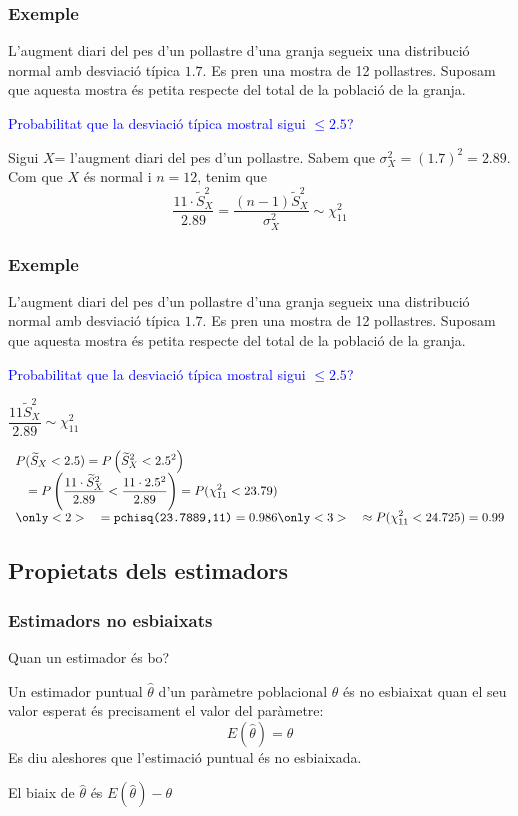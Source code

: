 \documentclass[12pt,t]{beamer}
\newcommand{\blue}[1]{\textcolor{blue}{#1}}
\renewcommand{\emph}[1]{{\color{red}#1}}
\renewcommand{\leq}{\leqslant}
\theoremstyle{plain}
\theoremstyle{definition}
\begin{document}
\begin{frame}
\frametitle{Exemple}
\vspace*{-2ex}

L'augment diari del pes d'un pollastre d'una granja segueix una
distribució normal amb desviació típica $1.7$. Es pren una
mostra de 12 pollastres. Suposam que aquesta mostra és petita respecte del total de la població de la granja.
\medskip

\blue{Probabilitat que la desviació típica mostral
sigui $\leq 2.5$?}
\medskip

Sigui $X$= l'augment diari del pes d'un pollastre. Sabem que $\sigma_{X}^2=(1.7)^2=2.89$. Com que $X$ és normal
 i $n=12$, tenim que
$$
\frac{11\cdot \widetilde{S}_{X}^2}{2.89}=\frac{(n-1)\widetilde{S}_{X}^2}{\sigma_{X}^2}\sim \chi^2_{11}
$$

        
\end{frame}


\begin{frame}
\frametitle{Exemple}
\vspace*{-2ex}

L'augment diari del pes d'un pollastre d'una granja segueix una
distribució normal amb desviació típica $1.7$. Es pren una
mostra de 12 pollastres. Suposam que aquesta mostra és petita respecte del total de la població de la granja.
\medskip

\blue{Probabilitat que la desviació típica mostral
sigui $\leq 2.5$?}
\medskip

$\dfrac{11\widetilde{S}_{X}^2}{2.89}\sim \chi^2_{11}$
\medskip

$\begin{array}{l}
\displaystyle P(\widetilde{S}_{X}<2.5)= P\left(\widetilde{S}_{X}^2<2.5^2\right)\\
\quad \displaystyle =P\left(\frac{11\cdot \widetilde{S}_{X}^2}{2.89}<\frac{11
\cdot 2.5^2}{2.89}\right)= P(\chi_{11}^2<23.79)\\
\only<2>{\quad\displaystyle=\mbox{\texttt{pchisq(23.7889,11)}}=0.986}
\only<3>{\quad \displaystyle \approx P(\chi_{11}^2<24.725)=0.99}
\end{array}$
        
\end{frame}


\subsection{Propietats dels estimadors}


\begin{frame}
\frametitle{Estimadors no esbiaixats}

Quan un estimador és bo?
\medskip

Un estimador puntual $\widehat{\theta}$ d'un paràmetre poblacional
$\theta$ és  \emph{no esbiaixat} quan el seu valor esperat és precisament el valor del paràmetre:
$$
E(\widehat{\theta})=\theta
$$ 
Es diu aleshores que l'estimació puntual és \emph{no esbiaixada}.
\medskip

El  \emph{biaix} de $\widehat{\theta}$ és $E(\widehat{\theta})-\theta$

\end{frame}
\end{document}
